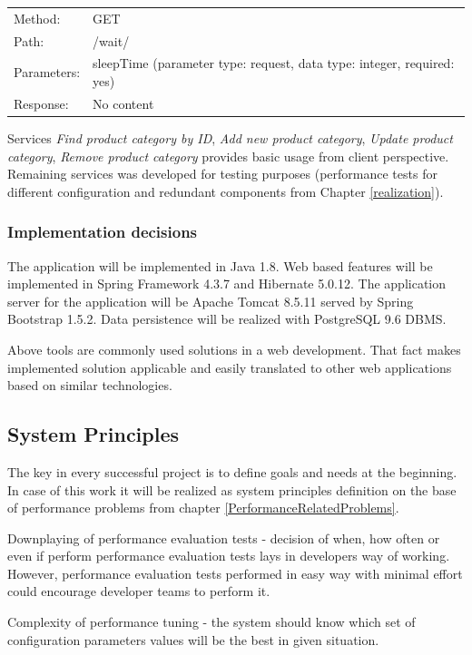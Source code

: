 \documentclass[12pt,a4paper]{article}
\begin{document}
{\renewcommand{\arraystretch}{1}
  \begin{tabular}{ll}
  Method: & GET \\
  Path: & /wait/ \\
  Parameters: & sleepTime (parameter type: request, data type: integer, required: yes)\\
  Response: & No content  \\
  \end{tabular} \vspace{5mm}
}
  
Services \textit{Find product category by ID}, \textit{Add new product category}, \textit{Update product category}, \textit{Remove product category} provides basic usage from client perspective. Remaining services was developed for testing purposes (performance tests for different configuration and redundant components from Chapter \ref{realization}).
  
\subsubsection{Implementation decisions} 
The application will be implemented in Java 1.8. Web based features will be implemented in Spring Framework 4.3.7 and Hibernate 5.0.12. The application server for the application will be Apache Tomcat 8.5.11 served by Spring Bootstrap 1.5.2. Data persistence will be realized with PostgreSQL 9.6 DBMS.  

Above tools are commonly used solutions in a web development. That fact makes implemented solution applicable and easily translated to other web applications based on similar technologies.  

\subsection{System Principles} \label{principles}
The key in every successful project is to define goals and needs at the beginning.
In case of this work it will be realized as system principles definition on the base of  performance problems from chapter \ref{PerformanceRelatedProblems}.

Downplaying of performance evaluation tests - decision of when, how often or even if perform performance evaluation tests lays in developers way of working. However, performance evaluation tests performed in easy way with minimal effort could encourage developer teams to perform it. 

Complexity of performance tuning - the system should know which set of configuration parameters values will be the best in given situation.  
\end{document}
